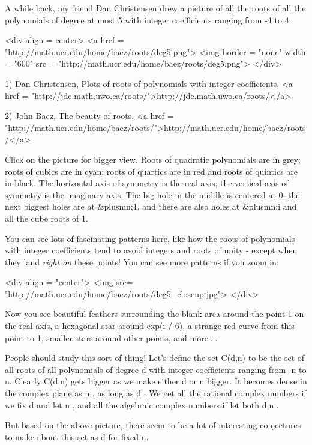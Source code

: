 

A while back, my friend Dan Christensen drew a picture of all the
roots of all the polynomials of degree at most 5 with integer
coefficients ranging from -4 to 4:

<div align = center>
<a href = "http://math.ucr.edu/home/baez/roots/deg5.png">
<img border = "none" width = "600" src = "http://math.ucr.edu/home/baez/roots/deg5.png">
</div>

1) Dan Christensen, Plots of roots of polynomials with integer
coefficients, <a href = "http://jdc.math.uwo.ca/roots/">http://jdc.math.uwo.ca/roots/</a>

2) John Baez, The beauty of roots, <a href = "http://math.ucr.edu/home/baez/roots/">http://math.ucr.edu/home/baez/roots/</a>

Click on the picture for bigger view.  Roots of quadratic polynomials
are in grey; roots of cubics are in cyan; roots of quartics are in red
and roots of quintics are in black.  The horizontal axis of symmetry
is the real axis; the vertical axis of symmetry is the imaginary axis.
The big hole in the middle is centered at 0; the next biggest holes
are at &plusmn;1, and there are also holes at &plusmn;i and all the
cube roots of 1.

You can see lots of fascinating patterns here, like how the roots of
polynomials with integer coefficients tend to avoid integers and roots
of unity - except when they land \emph{right on} these points!  You
can see more patterns if you zoom in:

<div align = "center">
<img src= "http://math.ucr.edu/home/baez/roots/deg5_closeup.jpg">
</div>

Now you see beautiful feathers surrounding the blank area
around the point 1 on the real axis, a hexagonal star
around exp(i \pi  / 6), a strange red curve from this point to 
1, smaller stars around other points, and more....

People should study this sort of thing!  Let's define the set
C(d,n) to be the set of all roots of all polynomials of
degree d with integer coefficients ranging from -n to n.  Clearly
C(d,n) gets bigger as we make either d or n bigger.  It
becomes dense in the complex plane as n \to  \infty , as long as
d .  We get all the rational complex numbers if we fix d 
and let n \to  \infty , and all the algebraic complex numbers if let
both d,n \to  \infty .  

But based on the above picture, there seem to be a lot of interesting
conjectures to make about this set as d \to  \infty  for fixed n.

